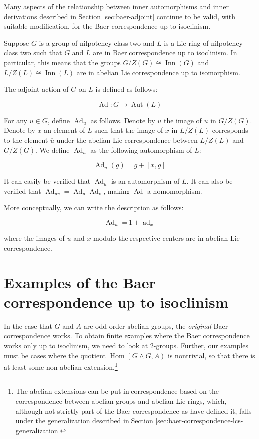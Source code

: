 Many aspects of the relationship between inner automorphisms and inner
derivations described in Section \ref{sec:baer-adjoint} continue to be
valid, with suitable modification, for the Baer correspondence up to
isoclinism.

Suppose $G$ is a group of nilpotency class two and $L$ is a Lie ring
of nilpotency class two such that $G$ and $L$ are in Baer
correspondence up to isoclinism. In particular, this means that the
groups $G/Z(G) \cong \operatorname{Inn}(G)$ and $L/Z(L) \cong
\operatorname{Inn}(L)$ are in abelian Lie correspondence up to
isomorphism.

The adjoint action of $G$ on $L$ is defined as follows:

$$\operatorname{Ad}: G \to \operatorname{Aut}(L)$$

For any $u \in G$, define $\operatorname{Ad}_u$ as follows. Denote by
$\overline{u}$ the image of $u$ in $G/Z(G)$. Denote by $x$ an element
of $L$ such that the image of $x$ in $L/Z(L)$ corresponds to the
element $\overline{u}$ under the abelian Lie correspondence between
$L/Z(L)$ and $G/Z(G)$. We define $\operatorname{Ad}_u$ as the
following automorphism of $L$:

$$\operatorname{Ad}_u(g) = g + [x,g]$$

It can easily be verified that $\operatorname{Ad}_u$ is an
automorphism of $L$. It can also be verified that
$\operatorname{Ad}_{uv} = \operatorname{Ad}_u\operatorname{Ad}_v$,
making $\operatorname{Ad}$ a homomorphism. 

More conceptually, we can write the description as follows:

$$\operatorname{Ad}_u = 1 + \operatorname{ad}_x$$

where the images of $u$ and $x$ modulo the respective centers are in
abelian Lie correspondence.

\section{Examples of the Baer correspondence up to isoclinism}\label{sec:bcuti-ex}

In the case that $G$ and $A$ are odd-order abelian groups, the {\em
  original} Baer correspondence works. To obtain finite examples where
the Baer correspondence works only up to isoclinism, we need to look
at $2$-groups. Further, our examples must be cases where the quotient
$\operatorname{Hom}(G \wedge G,A)$ is nontrivial, so that there is at
least some non-abelian extension.\footnote{The abelian extensions can
  be put in correspondence based on the correspondence between abelian
  groups and abelian Lie rings, which, although not strictly part of
  the Baer correspondence as have defined it, falls under the
  generalization described in Section
  \ref{sec:baer-correspondence-lcs-generalization}}

